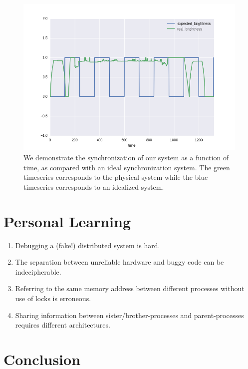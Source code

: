 \documentclass[preprint,review,12pt]{cs262}
\begin{document}
\begin{figure}[h]
  \centering
  \includegraphics[width=\textwidth]{figures/results}
  \caption{We demonstrate the synchronization of our system as a function of time, as compared with an ideal synchronization system. The green timeseries corresponds to the physical system while the blue timeseries corresponds to an idealized system. 
 \label{fig:res}}
\end{figure}

\section{Personal Learning} 


\begin{enumerate}
\item Debugging a (fake!) distributed system is hard. 

\item The separation between unreliable hardware and buggy code can be indecipherable. 

\item Referring to the same memory address between different processes without use of locks is erroneous. 

\item Sharing information between sister/brother-processes and parent-processes requires different architectures. 
\end{enumerate}

\section{Conclusion}
\end{document}
